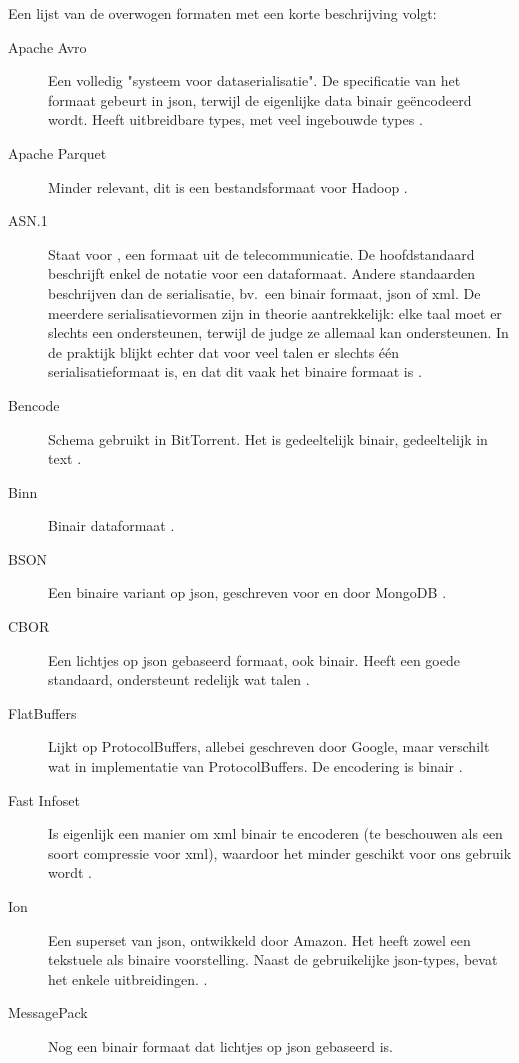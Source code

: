 Een lijst van de overwogen formaten met een korte beschrijving volgt:

\begin{description}
    \item[Apache Avro] Een volledig "systeem voor dataserialisatie".
    De specificatie van het formaat gebeurt in json, terwijl de eigenlijke data binair geëncodeerd wordt.
    Heeft uitbreidbare types, met veel ingebouwde types \autocite{avro}.
    \item[Apache Parquet] Minder relevant, dit is een bestandsformaat voor Hadoop \autocite{parquet}.
    \item[ASN.1] Staat voor , een formaat uit de telecommunicatie.
    De hoofdstandaard beschrijft enkel de notatie voor een dataformaat.
    Andere standaarden beschrijven dan de serialisatie, bv.\ een binair formaat, json of xml.
    De meerdere serialisatievormen zijn in theorie aantrekkelijk: elke taal moet er slechts een ondersteunen, terwijl de judge ze allemaal kan ondersteunen.
    In de praktijk blijkt echter dat voor veel talen er slechts één serialisatieformaat is, en dat dit vaak het binaire formaat is \autocite{x680}.
    \item[Bencode] Schema gebruikt in BitTorrent.
    Het is gedeeltelijk binair, gedeeltelijk in text \autocite{cohen2017}.
    \item[Binn] Binair dataformaat \autocite{ramos2019}.
    \item[BSON] Een binaire variant op json, geschreven voor en door MongoDB \autocite{bson}.
    \item[CBOR] Een lichtjes op json gebaseerd formaat, ook binair.
    Heeft een goede standaard, ondersteunt redelijk wat talen \autocite{rfc7049}.
    \item[FlatBuffers] Lijkt op ProtocolBuffers, allebei geschreven door Google, maar verschilt wat in implementatie van ProtocolBuffers.
    De encodering is binair \autocite{flatbuffers}.
    \item[Fast Infoset] Is eigenlijk een manier om xml binair te encoderen (te beschouwen als een soort compressie voor xml), waardoor het minder geschikt voor ons gebruik wordt \autocite{x981}.
    \item[Ion] Een superset van json, ontwikkeld door Amazon.
    Het heeft zowel een tekstuele als binaire voorstelling.
    Naast de gebruikelijke json-types, bevat het enkele uitbreidingen. \autocite{ion}.
    \item[MessagePack] Nog een binair formaat dat lichtjes op json gebaseerd is.

\end{description}
